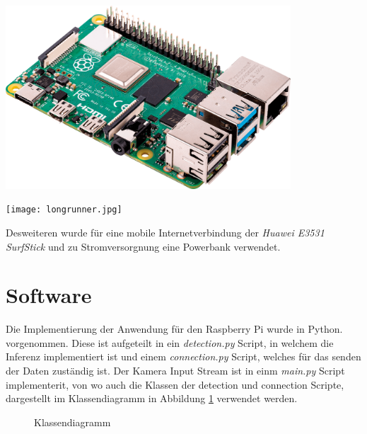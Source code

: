 

\begin{minipage}{0.55\textwidth}
    \centering
    \includegraphics[width=0.8\textwidth]{./Bilder/raspberrypi_4.png}
    \label{img:raspberrypi}
\end{minipage}
\begin{minipage}{0.45\textwidth}
    \centering
    \texttt{[image: longrunner.jpg]}
    \label{fig:rpicam}
\end{minipage}
\vspace{1cm}


Desweiteren wurde für eine mobile Internetverbindung 
der \textit{Huawei E3531 SurfStick} und zu Stromversorgnung
eine Powerbank verwendet.





\section{Software}


Die Implementierung der Anwendung für den Raspberry Pi wurde in Python.
vorgenommen. Diese ist aufgeteilt in ein \textit{detection.py} 
Script, in welchem die Inferenz implementiert ist und 
einem \textit{connection.py} Script, welches 
für das senden der Daten zuständig ist.
Der Kamera Input Stream ist in einm \textit{main.py} Script implementerit, 
von wo auch die Klassen der detection und connection Scripte, 
dargestellt im Klassendiagramm in Abbildung \ref{fig:class_diagram} 
verwendet werden.


\vspace{1cm}
\begin{figure}[H]
    \centering
        
    \caption{Klassendiagramm}
    \label{fig:class_diagram}
\end{figure}
\vspace{1cm}

